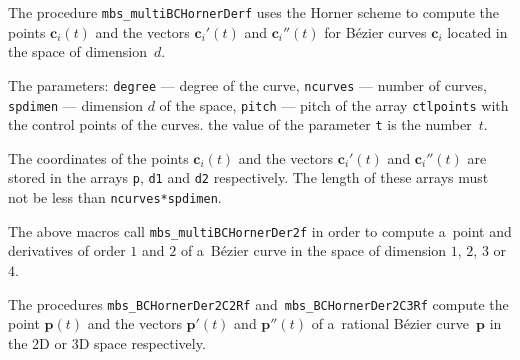\vspace{\bigskipamount}
\begin{sloppypar}
The procedure \texttt{mbs\_multiBCHornerDerf} uses the Horner scheme
to compute the points $\bm{c}_i(t)$ and the vectors $\bm{c}_i'(t)$ and
$\bm{c}_i''(t)$ for B\'{e}zier curves $\bm{c}_i$ located in the space of
dimension~$d$.
\end{sloppypar}

The parameters: \texttt{degree} --- degree of the curve, \texttt{ncurves}
--- number of curves, \texttt{spdimen} --- dimension $d$ of the space,
\texttt{pitch} --- pitch of the array \texttt{ctlpoints} with the control
points of the curves. the value of the parameter \texttt{t}
is the number~$t$.

The coordinates of the points $\bm{c}_i(t)$ and the vectors $\bm{c}_i'(t)$
and $\bm{c}_i''(t)$ are stored in the arrays \texttt{p}, \texttt{d1} and
\texttt{d2} respectively.
The length of these arrays must not be less than \texttt{ncurves*spdimen}.

\vspace{\bigskipamount}
The above macros call \texttt{mbs\_multiBCHornerDer2f} in order to
compute a~point and derivatives of order $1$ and $2$ of a~B\'{e}zier
curve in the space of dimension $1$, $2$, $3$ or $4$.

\vspace{\bigskipamount}
The procedures \texttt{mbs\_BCHornerDer2C2Rf} and~\texttt{mbs\_BCHornerDer2C3Rf}
compute the point $\bm{p}(t)$ and the vectors $\bm{p}'(t)$ and $\bm{p}''(t)$
of a~rational B\'{e}zier curve~$\bm{p}$ in the $2$D or $3$D space respectively.

